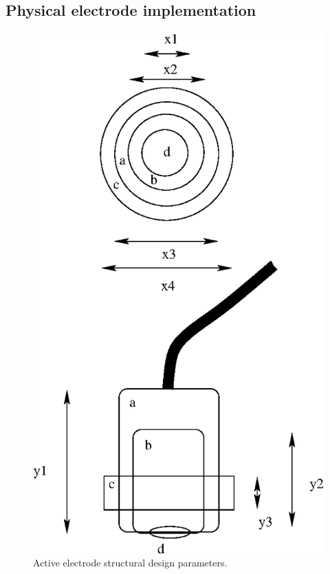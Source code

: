 \subsection{Physical electrode implementation}
\begin{center}
\begin{figure}[htbp]
	\begin{center}
	\includegraphics{electrode-imp.eps}
	\caption{Active electrode structural design parameters.}
	\label{fig:electrode-structure}
	\end{center}
\end{figure}
\end{center}

